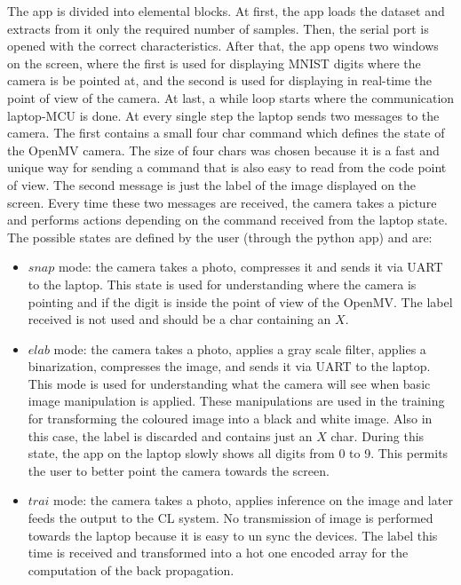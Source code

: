\documentclass[12pt]{report}
\begin{document}
The app is divided into elemental blocks. At first, the app loads the dataset and extracts from it only the required number of samples. Then, the serial port is opened with the correct characteristics. After that, the app opens two windows on the screen, where the first is used for displaying MNIST digits where the camera is be pointed at, and the second is used for displaying in real-time the point of view of the camera. At last, a while loop starts where the communication laptop-MCU is done. At every single step the laptop sends two messages to the camera. The first contains a small four char command which defines the state of the OpenMV camera. The size of four chars was chosen because it is a fast and unique way for sending a command that is also easy to read from the code point of view. The second message is just the label of the image displayed on the screen. Every time these two messages are received, the camera takes a picture and performs actions depending on the command received from the laptop state. The possible states are defined by the user (through the python app) and are: 

\begin{itemize}
	\item $snap$ mode: the camera takes a photo, compresses it and sends it via UART to the laptop. This state is used for understanding where the camera is pointing and if the digit is inside the point of view of the OpenMV. The label received is not used and should be a char containing an $X$.
	\item $elab$ mode: the camera takes a photo, applies a gray scale filter, applies a binarization, compresses the image, and sends it via UART to the laptop. This mode is used for understanding what the camera will see when basic image manipulation is applied. These manipulations are used in the training for transforming the coloured image into a black and white image. Also in this case, the label is discarded and contains just an $X$ char. During this state, the app on the laptop slowly shows all digits from 0 to 9. This permits the user to better point the camera towards the screen.
	\item $trai$ mode: the camera takes a photo, applies inference on the image and later feeds the output to the CL system. No transmission of image is performed towards the laptop because it is easy to un sync the devices. The label this time is received and transformed into a hot one encoded array for the computation of the back propagation.
\end{itemize}
\end{document}
